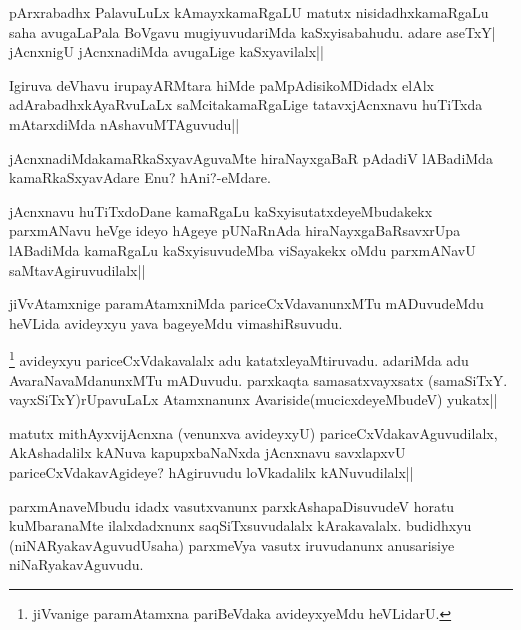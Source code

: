 \begin{artha}
pArxrabadhx PalavuLuLx kAmayxkamaRgaLU matutx nisidadhxkamaRgaLu saha avugaLaPala BoVgavu mugiyuvudariMda kaSxyisabahudu. adare aseTxY| jAcnxnigU jAcnxnadiMda avugaLige kaSxyavilalx||
\end{artha}

\begin{artha}
Igiruva deVhavu irupayARMtara hiMde paMpAdisikoMDidadx elAlx adArabadhxkAyaRvuLaLx saMcitakamaRgaLige tatavxjAcnxnavu huTiTxda mAtarxdiMda nAshavuMTAguvudu||
\end{artha}

\begin{artha}
jAcnxnadiMdakamaRkaSxyavAguvaMte hiraNayxgaBaR pAdadiV lABadiMda kamaRkaSxyavAdare Enu? hAni?-eMdare.
\end{artha}


\begin{artha}
jAcnxnavu huTiTxdoDane kamaRgaLu kaSxyisutatxdeyeMbudakekx parxmANavu heVge ideyo hAgeye pUNaRnAda hiraNayxgaBaRsavxrUpa lABadiMda kamaRgaLu kaSxyisuvudeMba viSayakekx oMdu parxmANavU saMtavAgiruvudilalx||
\end{artha}

\begin{artha}
jiVvAtamxnige paramAtamxniMda pariceCxVdavanunxMTu mADuvudeMdu heVLida avideyxyu yava bageyeMdu vimashiRsuvudu.
\end{artha}



\begin{artha}
\footnote{jiVvanige paramAtamxna pariBeVdaka avideyxyeMdu heVLidarU.} avideyxyu pariceCxVdakavalalx adu katatxleyaMtiruvadu. adariMda adu AvaraNavaMdanunxMTu mADuvudu. parxkaqta samasatxvayxsatx (samaSiTxY. vayxSiTxY)rUpavuLaLx Atamxnanunx Avariside(mucicxdeyeMbudeV) yukatx||
\end{artha}

\begin{artha}
matutx mithAyxvijAcnxna (venunxva avideyxyU) pariceCxVdakavAguvudilalx, AkAshadalilx 
kANuva kapupxbaNaNxda jAcnxnavu savxlapxvU pariceCxVdakavAgideye? hAgiruvudu loVkadalilx 
kANuvudilalx||
\end{artha}

\begin{artha}
parxmAnaveMbudu idadx vasutxvanunx parxkAshapaDisuvudeV horatu kuMbaranaMte ilalxdadxnunx 
saqSiTxsuvudalalx kArakavalalx. budidhxyu (niNARyakavAguvudUsaha) parxmeVya vasutx 
iruvudanunx anusarisiye niNaRyakavAguvudu.
\end{artha}

